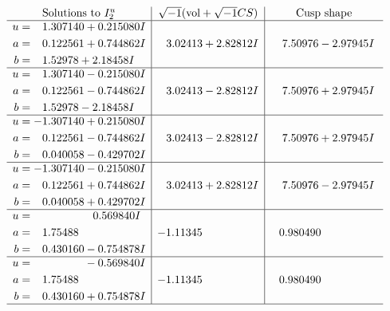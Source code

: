 \documentclass[1p]{elsarticle_modified}
\theoremstyle{definition}
\newcommand{\I}{\sqrt{-1}}
\begin{document}
$$\begin{array}{c|c|c}  
\text{Solutions to }I^u_{2}& \I (\text{vol} + \sqrt{-1}CS) & \text{Cusp shape}\\
 \hline 
\begin{aligned}
u &= \phantom{-}1.307140 + 0.215080 I \\
a &= \phantom{-}0.122561 + 0.744862 I \\
b &= \phantom{-}1.52978 + 2.18458 I\end{aligned}
 & \phantom{-}3.02413 + 2.82812 I & \phantom{-}7.50976 - 2.97945 I \\ \hline\begin{aligned}
u &= \phantom{-}1.307140 - 0.215080 I \\
a &= \phantom{-}0.122561 - 0.744862 I \\
b &= \phantom{-}1.52978 - 2.18458 I\end{aligned}
 & \phantom{-}3.02413 - 2.82812 I & \phantom{-}7.50976 + 2.97945 I \\ \hline\begin{aligned}
u &= -1.307140 + 0.215080 I \\
a &= \phantom{-}0.122561 - 0.744862 I \\
b &= \phantom{-}0.040058 - 0.429702 I\end{aligned}
 & \phantom{-}3.02413 - 2.82812 I & \phantom{-}7.50976 + 2.97945 I \\ \hline\begin{aligned}
u &= -1.307140 - 0.215080 I \\
a &= \phantom{-}0.122561 + 0.744862 I \\
b &= \phantom{-}0.040058 + 0.429702 I\end{aligned}
 & \phantom{-}3.02413 + 2.82812 I & \phantom{-}7.50976 - 2.97945 I \\ \hline\begin{aligned}
u &= \phantom{-0.000000 -}0.569840 I \\
a &= \phantom{-}1.75488\phantom{ +0.000000I} \\
b &= \phantom{-}0.430160 - 0.754878 I\end{aligned}
 & -1.11345\phantom{ +0.000000I} & \phantom{-}0.980490\phantom{ +0.000000I} \\ \hline\begin{aligned}
u &= \phantom{-0.000000 } -0.569840 I \\
a &= \phantom{-}1.75488\phantom{ +0.000000I} \\
b &= \phantom{-}0.430160 + 0.754878 I\end{aligned}
 & -1.11345\phantom{ +0.000000I} & \phantom{-}0.980490\phantom{ +0.000000I}\\
 \hline 
 \end{array}$$\newpage\newpage\renewcommand{\arraystretch}{1}
\end{document}
